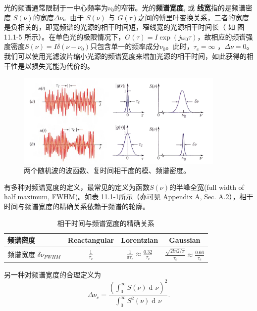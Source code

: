 \documentclass[UTF8]{ctexart}
\numberwithin{figure}{subsection}
\numberwithin{table}{subsection}
\DeclareMathOperator\dif{d\!}
\begin{document}
光的频谱通常限制于一中心频率为$ \nu_0 $的窄带。光的\textbf{频谱宽度}, 或 \textbf{线宽}指的是频谱密度 $ S(\nu) $的宽度$ \Delta \nu $。由于 $ S(\nu) $ 与 $ G(\tau) $之间的傅里叶变换关系，二者的宽度是负相关的，即宽频谱的光源的相干时间短，窄线宽的光源相干时间长（ 如 图 11.1-5 所示）。在单色光的极限情况下，$ G(\tau) = I \exp(j\omega_0 \tau) $，故相应的频谱强度密度$ S(\nu) = I \delta (\nu - \nu_0) $只包含单一的频率成分$ \nu_0 $。此时，$ \tau_c = \infty $ ，$ \Delta \nu = 0$。我们可以使用光滤波片缩小光源的频谱宽度来增加光源的相干时间，如此获得的相干性是以损失光能为代价的。
\begin{figure}[H]
\centering
\includegraphics[width=0.9\textwidth]{11_1_5.PNG}
\caption{两个随机波的波函数、复时间相干度的模、频谱密度。}
\label{fig: 11_1_5}
\end{figure}
\par 有多种对频谱宽度的定义，最常见的定义为函数$ S(\nu) $的半峰全宽(full width of half maximum, FWHM)。如表 11.1-1所示（亦可见 Appendix A, Sec. A.2），相干时间与频谱宽度的精确关系依赖于频谱的轮廓。\\
\begin{table}
\caption{相干时间与频谱宽度的精确关系}
\begin{center}
\begin{tabular}{lccc}
\hline
频谱密度 & Reactangular & Lorentzian & Gaussian \\
\hline
频谱宽度 $ \delta \nu_{FWHM} $ & $ \frac{1}{\tau_c} $ & $ \frac{1}{\pi \tau_c} \approx \frac{0.32}{\tau_c} $ & $ \frac{\sqrt{2 ln2 / \pi}}{\tau_c} \approx \frac{0.66}{\tau_c} $ \\
\hline
\end{tabular}
\end{center}
\end{table}
\par 另一种对频谱宽度的合理定义为
\begin{equation}
\Delta \nu_c = \frac{(\int_0^\infty S(\nu) \dif \nu)^2}{\int_0^\infty S^2(\nu) \dif \nu}.
\end{equation}
\end{document}
